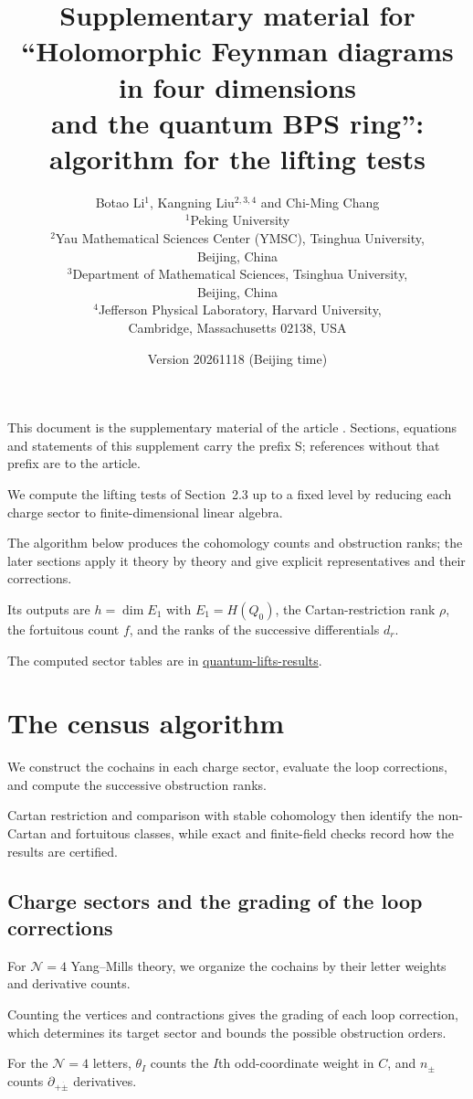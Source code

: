 \documentclass[11pt]{article}
\title{Supplementary material for\\ ``Holomorphic Feynman diagrams in four dimensions\\ and the quantum BPS ring'':\\[4pt] algorithm for the lifting tests}
\author{Botao Li$^{1}$, Kangning Liu$^{2,3,4}$ and Chi-Ming Chang\\[6pt]
{\small $^{1}$Peking University}\\[3pt]
{\small $^{2}$Yau Mathematical Sciences Center (YMSC), Tsinghua University,}\\
{\small Beijing, China}\\[3pt]
{\small $^{3}$Department of Mathematical Sciences, Tsinghua University,}\\
{\small Beijing, China}\\[3pt]
{\small $^{4}$Jefferson Physical Laboratory, Harvard University,}\\
{\small Cambridge, Massachusetts 02138, USA}}
\date{\small Version 20261118 (Beijing time)}
\numberwithin{equation}{section}
\numberwithin{figure}{section}
\numberwithin{table}{section}
\begin{document}
\maketitle
\noindent This document is the supplementary material of the article \cite{MainArticle}. Sections, equations and statements of this supplement carry the prefix S; references without that prefix are to the article.
{\small\setcounter{tocdepth}{2}\tableofcontents}
\bigskip

We compute the lifting tests of Section~2.3 up to a fixed level by reducing each charge sector to finite-dimensional linear algebra.

The algorithm below produces the cohomology counts and obstruction ranks; the later sections apply it theory by theory and give explicit representatives and their corrections.

Its outputs are $h=\dim E_1$ with $E_1=H(Q_0)$, the Cartan-restriction rank $\rho$, the fortuitous count $f$, and the ranks of the successive differentials $d_r$.

The computed sector tables are in \href{https://github.com/lbotao399-stack/quantum-lifts-results}{quantum-lifts-results}.

\section{The census algorithm}\label{sec-E-alg}

We construct the cochains in each charge sector, evaluate the loop corrections, and compute the successive obstruction ranks.

Cartan restriction and comparison with stable cohomology then identify the non-Cartan and fortuitous classes, while exact and finite-field checks record how the results are certified.

\subsection{Charge sectors and the grading of the loop corrections}\label{sec-E-sectors}

For $\mathcal N=4$ Yang--Mills theory, we organize the cochains by their letter weights and derivative counts.

Counting the vertices and contractions gives the grading of each loop correction, which determines its target sector and bounds the possible obstruction orders.

For the $\mathcal N=4$ letters, $\theta_I$ counts the $I$th odd-coordinate weight in $C$, and $n_\pm$ counts $\partial_{+\dot\pm}$ derivatives.
\end{document}
